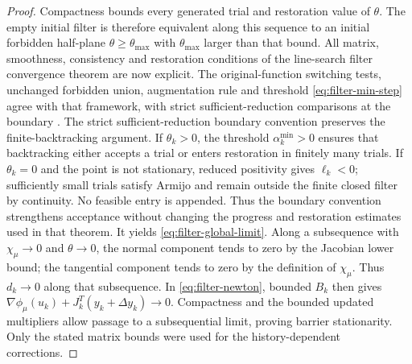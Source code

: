 \documentclass[pdflatex,sn-mathphys-num]{sn-jnl}
\theoremstyle{thmstyleone}
\theoremstyle{thmstylethree}
\begin{document}
\begin{proof}
Compactness bounds every generated trial and restoration value of
$\theta$. The empty initial filter is therefore equivalent along this
sequence to an initial forbidden half-plane $\theta\geq\theta_{\max}$
with $\theta_{\max}$ larger than that bound.
All matrix, smoothness, consistency and restoration conditions of
the line-search filter convergence theorem are now explicit.
The original-function switching tests, unchanged forbidden union,
augmentation rule and threshold \eqref{eq:filter-min-step} agree
with that framework, with strict sufficient-reduction comparisons
at the boundary \citep{WachterBiegler2005Global}.
The strict sufficient-reduction boundary convention preserves the
finite-backtracking argument. If $\theta_k>0$, the threshold
$\alpha_k^{\min}>0$ ensures that backtracking either accepts a
trial or enters restoration in finitely many trials. If $\theta_k=0$
and the point is not stationary, reduced positivity gives
$\ell_k<0$; sufficiently small trials satisfy Armijo and remain
outside the finite closed filter by continuity. No feasible entry
is appended. Thus the boundary convention strengthens acceptance
without changing the progress and restoration estimates used in
that theorem. It yields \eqref{eq:filter-global-limit}.
Along a subsequence with $\chi_\mu\to0$ and $\theta\to0$,
the normal component tends to zero by the Jacobian lower bound;
the tangential component tends to zero by the definition of
$\chi_\mu$.
Thus $d_k\to0$ along that subsequence.
In \eqref{eq:filter-newton}, bounded $B_k$ then gives
$\nabla\phi_\mu(u_k)+J_k^T(y_k+\Delta y_k)\to0$.
Compactness and the bounded updated multipliers allow passage to
a subsequential limit, proving barrier stationarity.
Only the stated matrix bounds were used for the history-dependent
corrections.
\end{proof}
\end{document}
